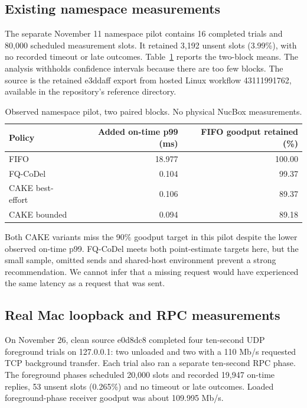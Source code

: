 \subsection{Existing namespace measurements}
The separate November 11 namespace pilot contains 16 completed trials and
80,000 scheduled measurement slots. It retained 3,192 unsent slots (3.99\%),
with no recorded timeout or late outcomes. Table~\ref{tab:pilot} reports the
two-block means. The analysis withholds confidence intervals because there
are too few blocks. The source is the retained e3ddaff export from hosted
Linux workflow 43111991762, available in the repository's reference directory.

\begin{table}[htbp]\centering
\caption{Observed namespace pilot, two paired blocks. No physical NucBox measurements.}\label{tab:pilot}
\begin{tabular}{lrr}\toprule
Policy & Added on-time p99 (ms) & FIFO goodput retained (\%)\\\midrule
FIFO & 18.977 & 100.00\\
FQ-CoDel & 0.104 & 99.37\\
CAKE best-effort & 0.106 & 89.37\\
CAKE bounded & 0.094 & 89.18\\\bottomrule
\end{tabular}
\end{table}

Both CAKE variants miss the 90\% goodput target in this pilot despite the
lower observed on-time p99. FQ-CoDel meets both point-estimate targets here,
but the small sample, omitted sends and shared-host environment prevent a
strong recommendation. We cannot infer that a missing request would have
experienced the same latency as a request that was sent.

\subsection{Real Mac loopback and RPC measurements}
On November 26, clean source e0d8dc8 completed four ten-second UDP foreground
trials on 127.0.0.1: two unloaded and two with a 110 Mb/s requested TCP
background transfer. Each trial also ran a separate ten-second RPC phase.
The foreground phases scheduled 20,000 slots and recorded 19,947 on-time
replies, 53 unsent slots (0.265\%) and no timeout or late outcomes.
Loaded foreground-phase receiver goodput was about 109.995 Mb/s.

